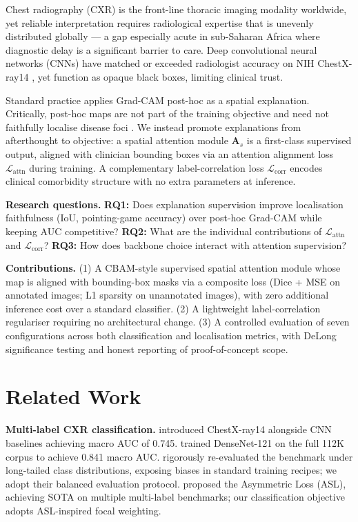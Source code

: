 \documentclass[10pt,twocolumn,letterpaper]{article}
\begin{document}
Chest radiography (CXR) is the front-line thoracic imaging modality worldwide, yet
reliable interpretation requires radiological expertise that is unevenly distributed
globally --- a gap especially acute in sub-Saharan Africa where diagnostic delay is a
significant barrier to care. Deep convolutional neural networks (CNNs) have matched or
exceeded radiologist accuracy on NIH ChestX-ray14 \citep{wang2017chestxray}, yet
function as opaque black boxes, limiting clinical trust.

Standard practice applies Grad-CAM post-hoc as a spatial explanation. Critically,
post-hoc maps are not part of the training objective and need not faithfully localise
disease foci \citep{attrinet2023}. We instead promote explanations from afterthought to
objective: a spatial attention module $\mathbf{A}_s$ is a first-class supervised
output, aligned with clinician bounding boxes via an attention alignment loss
$\mathcal{L}_{\text{attn}}$ during training. A complementary label-correlation loss
$\mathcal{L}_{\text{corr}}$ encodes clinical comorbidity structure with no extra
parameters at inference.

\textbf{Research questions.}
\textbf{RQ1:} Does explanation supervision improve localisation faithfulness (IoU,
pointing-game accuracy) over post-hoc Grad-CAM while keeping AUC competitive?
\textbf{RQ2:} What are the individual contributions of $\mathcal{L}_{\text{attn}}$
and $\mathcal{L}_{\text{corr}}$?
\textbf{RQ3:} How does backbone choice interact with attention supervision?

\textbf{Contributions.}
(1) A CBAM-style supervised spatial attention module whose map is aligned with
bounding-box masks via a composite loss (Dice + MSE on annotated images; L1 sparsity
on unannotated images), with zero additional inference cost over a standard classifier.
(2) A lightweight label-correlation regulariser requiring no architectural change.
(3) A controlled evaluation of seven configurations across both classification and
localisation metrics, with DeLong significance testing and honest reporting of
proof-of-concept scope.

\section{Related Work}

\noindent\textbf{Multi-label CXR classification.}
\citet{wang2017chestxray} introduced ChestX-ray14 alongside CNN baselines achieving
macro AUC of 0.745. \citet{chexnet2017} trained DenseNet-121 on the full 112K corpus
to achieve 0.841 macro AUC. \citet{holste2022} rigorously re-evaluated the benchmark
under long-tailed class distributions, exposing biases in standard training recipes;
we adopt their balanced evaluation protocol. \citet{asl2021} proposed the Asymmetric
Loss (ASL), achieving SOTA on multiple multi-label benchmarks; our classification
objective adopts ASL-inspired focal weighting.
\end{document}
